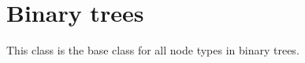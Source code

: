 \chapter{Binary trees}
\label{chap-binary-trees}


This class is the base class for all node types in binary trees.
